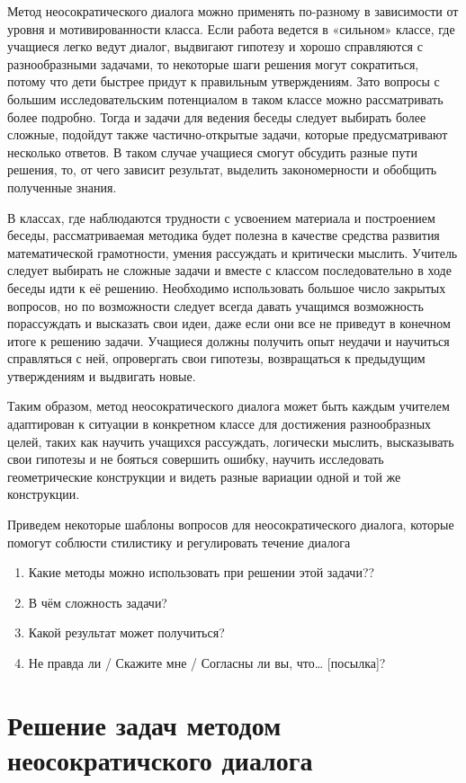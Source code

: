 \documentclass[a4paper,14pt,russian]{extreport}
\begin{document}
Метод неосократического диалога можно применять по-разному в зависимости от уровня и мотивированности класса. Если работа ведется в «сильном» классе, где учащиеся легко ведут диалог, выдвигают гипотезу и хорошо справляются с разнообразными задачами, то некоторые шаги решения могут сократиться, потому что дети быстрее придут к правильным утверждениям. Зато вопросы с большим исследовательским потенциалом в таком классе можно рассматривать более подробно. Тогда и задачи для ведения беседы следует выбирать более сложные, подойдут также частично-открытые задачи, которые предусматривают несколько ответов. В таком случае учащиеся смогут обсудить разные пути решения, то, от чего зависит результат, выделить закономерности и обобщить полученные знания.

В классах, где наблюдаются трудности с усвоением материала и построением беседы, рассматриваемая методика будет полезна в качестве средства развития математической грамотности, умения рассуждать и критически мыслить. Учитель следует выбирать не сложные задачи и вместе с классом последовательно в ходе беседы идти к её решению. Необходимо использовать большое число закрытых вопросов, но по возможности следует всегда давать учащимся возможность порассуждать и высказать свои идеи, даже если они все не приведут в конечном итоге к решению задачи. Учащиеся должны получить опыт неудачи и научиться справляться с ней, опровергать свои гипотезы, возвращаться к предыдущим утверждениям и выдвигать новые. 

Таким образом, метод неосократического диалога может быть каждым учителем адаптирован к ситуации в конкретном классе для достижения разнообразных целей, таких как научить учащихся рассуждать, логически мыслить, высказывать свои гипотезы и не бояться совершить ошибку, научить исследовать геометрические конструкции и видеть разные вариации одной и той же конструкции.

Приведем некоторые шаблоны вопросов для неосократического диалога, которые помогут соблюсти стилистику и регулировать течение диалога
\begin{enumerate}
\item Какие методы можно использовать при решении этой задачи?? 
\item В чём сложность задачи?
\item Какой результат может получиться?
\item Не правда ли / Скажите мне / Согласны ли вы, что… [посылка]?
\end{enumerate}
\chapter*{Решение задач методом неосократичского диалога}
\end{document}
